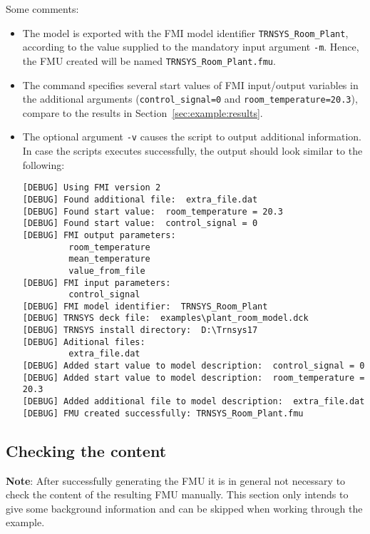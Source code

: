 Some comments:
\begin{itemize}
  \item The model is exported with the FMI model identifier \verb!TRNSYS_Room_Plant!, according to the value supplied to the mandatory input argument \verb!-m!.
  Hence, the FMU created will be named \verb!TRNSYS_Room_Plant.fmu!.

  \item The command specifies several start values of FMI input/output variables in the additional arguments (\verb!control_signal=0! and \verb!room_temperature=20.3!), compare to the results in Section~\ref{sec:example:results}.
  
  \item The optional argument \verb!-v! causes the script to output additional information. In case the scripts executes successfully, the output should look similar to the following:
\begin{verbatim}
[DEBUG] Using FMI version 2
[DEBUG] Found additional file:  extra_file.dat
[DEBUG] Found start value:  room_temperature = 20.3
[DEBUG] Found start value:  control_signal = 0
[DEBUG] FMI output parameters:
         room_temperature
         mean_temperature
         value_from_file
[DEBUG] FMI input parameters:
         control_signal
[DEBUG] FMI model identifier:  TRNSYS_Room_Plant
[DEBUG] TRNSYS deck file:  examples\plant_room_model.dck
[DEBUG] TRNSYS install directory:  D:\Trnsys17
[DEBUG] Aditional files:
         extra_file.dat
[DEBUG] Added start value to model description:  control_signal = 0
[DEBUG] Added start value to model description:  room_temperature = 20.3
[DEBUG] Added additional file to model description:  extra_file.dat
[DEBUG] FMU created successfully: TRNSYS_Room_Plant.fmu
\end{verbatim}

\end{itemize}


\subsection{Checking the content}

\textbf{Note}: After successfully generating the FMU it is in general not necessary to check the content of the resulting FMU manually.
This section only intends to give some background information and can be skipped when working through the example.

